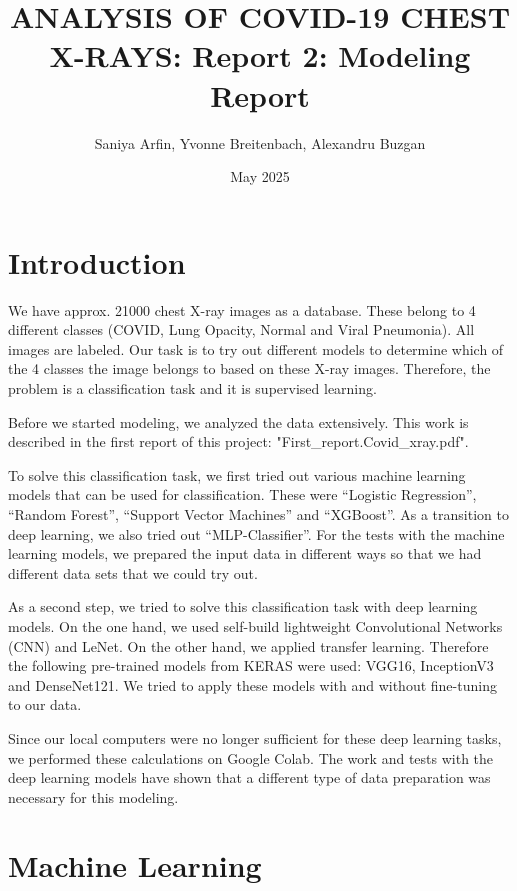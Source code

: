 \documentclass{article}
\title{ANALYSIS OF COVID-19 CHEST X-RAYS: Report 2: Modeling Report}
\author{Saniya Arfin, Yvonne Breitenbach, Alexandru Buzgan}
\date{May 2025}
\begin{document}
\maketitle

\tableofcontents

\newpage 

\section{Introduction}

We have approx. 21000 chest X-ray images as a database. These belong to 4 different classes (COVID, Lung Opacity, Normal and Viral Pneumonia). All images are labeled. Our task is to try out different models to determine which of the 4 classes the image belongs to based on these X-ray images. Therefore, the problem is a classification task and it is supervised learning. 

Before we started modeling, we analyzed the data extensively. This work is described in the first report of this project: "First\_report.Covid\_xray.pdf".

To solve this classification task, we first tried out various machine learning models that can be used for classification. 
These were “Logistic Regression”, “Random Forest”, “Support Vector Machines” and “XGBoost”. As a transition to deep learning, we also tried out “MLP-Classifier”. 
For the tests with the machine learning models, we prepared the input data in different ways so that we had different data sets that we could try out.

As a second step, we tried to solve this classification task with deep learning models. On the one hand, we used self-build lightweight Convolutional Networks (CNN) and LeNet. On the other hand, we applied transfer learning. Therefore the following pre-trained models from KERAS were used: VGG16, InceptionV3 and DenseNet121. We tried to apply these models with and without fine-tuning to our data. 

Since our local computers were no longer sufficient for these deep learning tasks, we performed these calculations on Google Colab. The work and tests with the deep learning models have shown that a different type of data preparation was necessary for this modeling. 

\section{Machine Learning}
\end{document}
